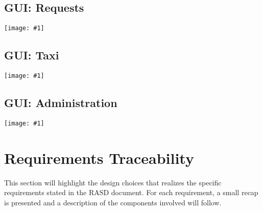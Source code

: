 \documentclass[11pt, a4paper,titlepage]{article}
\newcommand{\image}[1]{
	\begin{center}
		\noindent \texttt{[image: \#1]}
	\end{center}
	}
\begin{document}
	\subsection{GUI: Requests}
		\image{gui_requests.png}
	\subsection{GUI: Taxi}
		\image{gui_taxi.png}
	\subsection{GUI: Administration}
		\image{gui_administration.png}
\section{Requirements Traceability}
	This section will highlight the design choices that realizes the specific requirements stated in the RASD document. For each requirement, a small recap is presented and a description of the components involved will follow.
\end{document}
